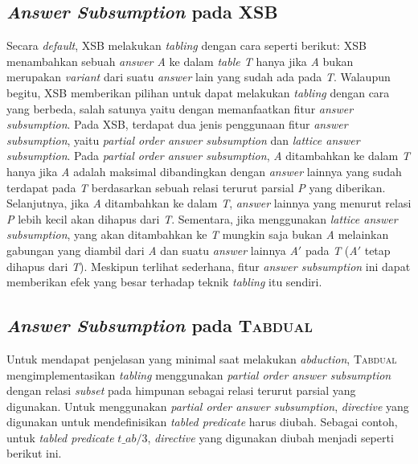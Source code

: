\subsection{\textit{Answer Subsumption} pada XSB}
Secara \textit{default}, XSB melakukan \textit{tabling} dengan cara seperti berikut: XSB menambahkan sebuah \textit{answer A} ke dalam \textit{table T} hanya jika \textit{A} bukan merupakan \textit{variant} dari suatu \textit{answer} lain yang sudah ada pada \textit{T}. Walaupun begitu, XSB memberikan pilihan untuk dapat melakukan \textit{tabling} dengan cara yang berbeda, salah satunya yaitu dengan memanfaatkan fitur \textit{answer subsumption}. Pada XSB, terdapat dua jenis penggunaan fitur \textit{answer subsumption}, yaitu \textit{partial order answer subsumption} dan \textit{lattice answer subsumption}. Pada \textit{partial order answer subsumption}, \textit{A} ditambahkan ke dalam \textit{T} hanya jika \textit{A} adalah maksimal dibandingkan dengan \textit{answer} lainnya yang sudah terdapat pada \textit{T} berdasarkan sebuah relasi terurut parsial \textit{P} yang diberikan. Selanjutnya, jika \textit{A} ditambahkan ke dalam \textit{T}, \textit{answer} lainnya yang menurut relasi \textit{P} lebih kecil akan dihapus dari \textit{T}. Sementara, jika menggunakan \textit{lattice answer subsumption}, yang akan ditambahkan ke \textit{T} mungkin saja bukan \textit{A} melainkan gabungan yang diambil dari \textit{A} dan suatu \textit{answer} lainnya \textit{A$'$} pada \textit{T} (\textit{A$'$} tetap dihapus dari \textit{T}). Meskipun terlihat sederhana, fitur \textit{answer subsumption} ini dapat memberikan efek yang besar terhadap teknik \textit{tabling} itu sendiri.

\subsection{\textit{Answer Subsumption} pada \textsc{Tabdual}}
Untuk mendapat penjelasan yang minimal saat melakukan \textit{abduction}, \textsc{Tabdual} mengimplementasikan \textit{tabling} menggunakan \textit{partial order answer subsumption} dengan relasi \textit{subset} pada himpunan sebagai relasi terurut parsial yang digunakan. Untuk menggunakan \textit{partial order answer subsumption}, \textit{directive} yang digunakan untuk mendefinisikan \textit{tabled predicate} harus diubah. Sebagai contoh, untuk \textit{tabled predicate} \textit{$t\_ab/$}3, \textit{directive} yang digunakan diubah menjadi seperti berikut ini.
\\

